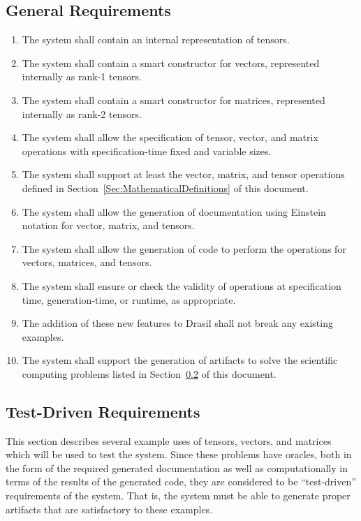 \documentclass[12pt]{article}
\begin{document}
\subsection{General Requirements}

\begin{enumerate}[label={R\arabic*.}]
\item The system shall contain an internal representation of tensors.
\item The system shall contain a smart constructor for vectors, represented
      internally as rank-1 tensors.
\item The system shall contain a smart constructor for matrices, represented
      internally as rank-2 tensors.
\item The system shall allow the specification of tensor, vector, and
      matrix operations with specification-time fixed and variable sizes.
\item The system shall support at least the vector, matrix, and tensor operations
      defined in Section~\ref{Sec:MathematicalDefinitions} of this document.
\item The system shall allow the generation of documentation using Einstein
      notation for vector, matrix, and tensors.
\item The system shall allow the generation of code to perform the operations
      for vectors, matrices, and tensors.
\item The system shall ensure or check the validity of operations at specification 
      time, generation-time, or runtime, as appropriate.
\item The addition of these new features to Drasil shall not break any existing
      examples.
\item The system shall support the generation of artifacts to solve the scientific
      computing problems listed in Section~\ref{Subsec:TDR} of this document.
\end{enumerate}

\subsection{Test-Driven Requirements}\label{Subsec:TDR}
This section describes several example uses of tensors, vectors,
and matrices which will be used to test the system. Since these problems
have oracles, both in the form of the required generated documentation as well as
computationally in terms of the results of the generated code, they are considered
to be ``test-driven'' requirements of the system. That is, the system must be
able to generate proper artifacts that are satisfactory to these examples. 
\end{document}
